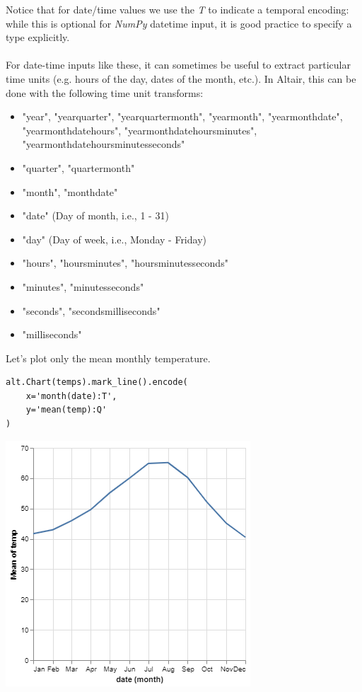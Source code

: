 \documentclass[11pt]{article}
\begin{document}
Notice that for date/time values we use the \textit{T} to indicate a temporal encoding: while this is optional for \textit{NumPy} datetime input, it is good practice to specify a type explicitly.\\
\\
For date-time inputs like these, it can sometimes be useful to extract particular time units (e.g. hours of the day, dates of the month, etc.). In Altair, this can be done with the following time unit transforms:

\begin{itemize}
    \item "year", "yearquarter", "yearquartermonth", "yearmonth", "yearmonthdate", "yearmonthdatehours", "yearmonthdatehoursminutes", "yearmonthdatehoursminutesseconds"
    \item "quarter", "quartermonth"
    \item "month", "monthdate"
    \item "date" (Day of month, i.e., 1 - 31)
    \item "day" (Day of week, i.e., Monday - Friday)
    \item "hours", "hoursminutes", "hoursminutesseconds"
    \item "minutes", "minutesseconds"
    \item "seconds", "secondsmilliseconds"
    \item "milliseconds"
\end{itemize}

Let's plot only the mean monthly temperature.

\begin{verbatim}
alt.Chart(temps).mark_line().encode(
    x='month(date):T',
    y='mean(temp):Q'
)
\end{verbatim}

\begin{center}
\includegraphics[width=.5\textwidth]{visualization (2).png}
\end{center}
\end{document}
